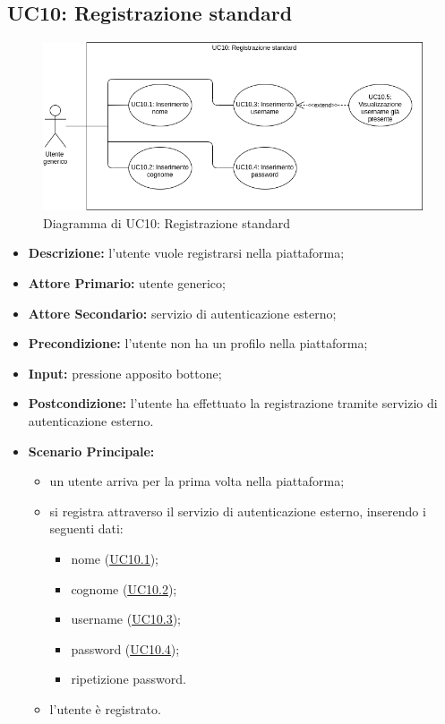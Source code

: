 \newpage
\subsection{UC10: Registrazione standard}
\label{sec:UC10}
\begin{figure}[!ht]
    \caption{Diagramma di UC10: Registrazione standard}
    \vspace{10px}
    \includegraphics[scale=0.5]{../../../Images/AnalisiRequisiti/UC10}
    \centering
\end{figure}
\begin{itemize}
    \item \textbf{Descrizione:} l'utente vuole registrarsi nella piattaforma;
    \item \textbf{Attore Primario:} utente generico;
    \item \textbf{Attore Secondario:} servizio di autenticazione esterno;
    \item \textbf{Precondizione:} l'utente non ha un profilo nella piattaforma;
    \item \textbf{Input:} pressione apposito bottone;
    \item \textbf{Postcondizione:} l'utente ha effettuato la registrazione tramite servizio di autenticazione esterno. 
    \item \textbf{Scenario Principale:}
    \begin{itemize}
        \item un utente arriva per la prima volta nella piattaforma;
        \item si registra attraverso il servizio di autenticazione esterno, inserendo i seguenti dati:
        \begin{itemize}
            \item nome (\hyperref[sec:UC10.1]{\underline{UC10.1}});
            \item cognome (\hyperref[sec:UC10.2]{\underline{UC10.2}});
            \item username (\hyperref[sec:UC10.3]{\underline{UC10.3}});
            \item password (\hyperref[sec:UC10.4]{\underline{UC10.4}});
            \item ripetizione password.
        \end{itemize}
        \item l'utente è registrato.
    \end{itemize} 
\end{itemize}

